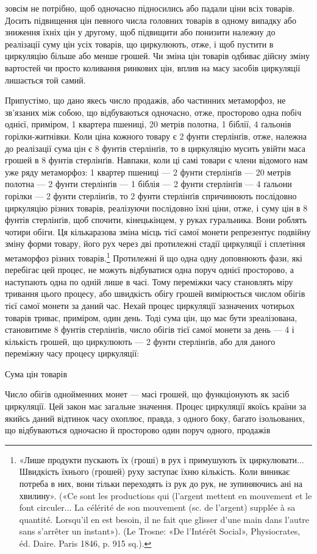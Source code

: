 \parcont{}  %
зовсім не потрібно, щоб одночасно підносились або падали ціни
всіх товарів. Досить підвищення цін певного числа головних
товарів в одному випадку або зниження їхніх цін у другому,
щоб підвищити або понизити належну до реалізації суму цін
усіх товарів, що циркулюють, отже, і щоб пустити в циркуляцію
більше або менше грошей. Чи зміна цін товарів одбиває дійсну
зміну вартостей чи просто коливання ринкових цін, вплив на
масу засобів циркуляції лишається той самий.

Припустімо, що дано якесь число продажів, або частинних
метаморфоз, не зв’язаних між собою, що відбуваються одночасно,
отже, просторово одна побіч однієї, приміром, 1 квартера пшениці,
20 метрів полотна, 1 біблії, 4 ґальонів горілки-житнівки. Коли
ціна кожного товару є 2 фунти стерлінґів, отже, належна до реалізації
сума цін є 8 фунтів стерлінґів, то в циркуляцію мусить
увійти маса грошей в 8 фунтів стерлінґів. Навпаки, коли ці самі
товари є члени відомого нам уже ряду метаморфоз: 1 квартер
пшениці — 2 фунти стерлінґів — 20 метрів полотна — 2 фунти
стерлінґів — 1 біблія — 2 фунти стерлінґів — 4 ґальони горілки —
2 фунти стерлінґів, то 2 фунти стерлінґів спричинюють послідовно
циркуляцію різних товарів, реалізуючи послідовно їхні
ціни, отже, і суму цін в 8 фунтів стерлінґів, щоб спочити, кінецькінцем,
у руках гуральника. Вони роблять чотири обіги. Ця
кількаразова зміна місць тієї самої монети репрезентує подвійну
зміну форми товару, його рух через дві протилежні стадії циркуляції
і сплетіння метаморфоз різних товарів.\footnote{
«Лише продукти пускають їх (гроші) в рух і примушують їх
циркулювати... Швидкість їхнього (грошей) руху заступає їхню кількість.
Коли виникає потреба в них, вони тільки переходять із рук до рук, не
зупиняючись ані на хвилину». («Ce sont les productions qui (l’argent
mettent en mouvement et le font circuler... La célérité de son mouvement
(sc. de l’argent) supplée à sa quantité. Lorsqu’il en est besoin, il ne fait
que glisser d’une main dans l’autre sans s’arrêter un instant»). (Le Trosne:
«De l’Intérêt Social», Physiocrates, éd. Daire. Paris 1846, p. 915 sq.).
} Протилежні й
що одна одну доповнюють фази, які перебігає цей процес, не можуть
відбуватися одна поруч однієї просторово, а наступають
одна по одній лише в часі. Тому переміжки часу становлять міру
тривання цього процесу, або швидкість обігу грошей вимірюється
числом обігів тієї самої монети за даний час. Нехай процес
циркуляції зазначених чотирьох товарів триває, приміром, один
день. Тоді сума цін, що має бути зреалізована, становитиме
8 фунтів стерлінґів, число обігів тієї самої монети за день — 4
і кількість грошей, що циркулюють — 2 фунти стерлінґів, або
для даного переміжну часу процесу циркуляції:

Сума цін товарів

Число обігів однойменних монет — масі грошей, що функціонують
як засіб циркуляції. Цей закон має загальне значення.
Процес циркуляції якоїсь країни за якийсь даний відтинок часу
охоплює, правда, з одного боку, багато ізольованих, що відбуваються
одночасно й просторово один поруч одного, продажів
\parbreak{}  %

